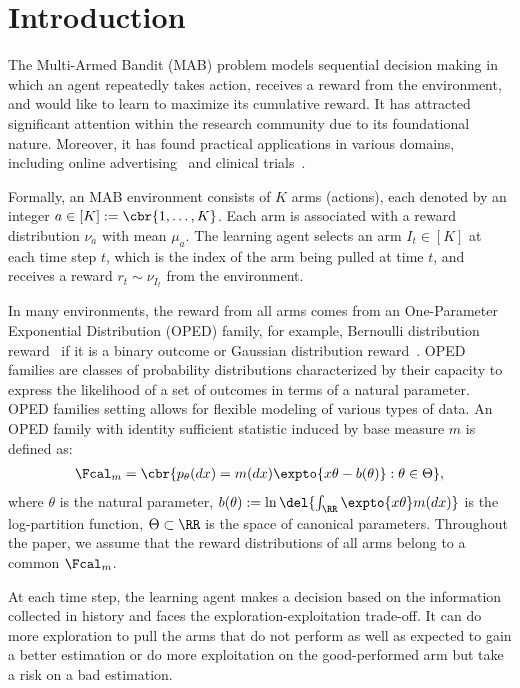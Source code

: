 \section{Introduction}

The Multi-Armed Bandit (MAB) problem models sequential decision making in which an agent repeatedly takes action, receives a reward from the environment, and would like to learn to maximize its cumulative reward.
It has attracted significant attention within the research community due to its foundational nature. Moreover, it has found practical applications in various domains, including online advertising~\citep{geng2021comparison} and clinical trials~\citep{villar2015multi}.

Formally, an MAB environment consists of $K$ arms (actions), each denoted by an integer $a \in [K]:= \cbr{1, \dots, K}$. 
Each arm is associated with a reward distribution $\nu_a$ with mean $\mu_a$. The learning agent selects an arm $I_t \in [K]$ at each time step $t$, which is the index of the arm being pulled at time $t$, and receives a reward $r_t \sim \nu_{I_t}$ from the environment.

In many environments, the reward from all arms comes from an One-Parameter Exponential Distribution (OPED) family, for example, Bernoulli distribution reward~\citep{bouneffouf2017bandit,shen2015portfolio} if it is a binary outcome or Gaussian distribution reward~\citep{jin2021mots}. OPED families are classes of probability distributions characterized by their capacity to express the likelihood of a set of outcomes in terms of a natural parameter. OPED families setting allows for flexible modeling of various types of data.
An OPED family with identity sufficient statistic induced by base measure $m$ is defined as:
\begin{align} \label{eqn:oped}
    \Fcal_m = \cbr{ p_\theta(dx) = m( dx ) \expto{ x \theta - b(\theta) }: \theta \in \Theta  },
\end{align}
where $\theta$ is the natural parameter, $b(\theta) := \ln\del{\int_\RR \expto{ x \theta } m(dx)}$ is the log-partition function, $\Theta \subset \RR$ is the space of canonical parameters. Throughout the paper, we assume that the reward distributions of all arms belong to a common $\Fcal_m$.

At each time step, the learning agent makes a decision based on the information collected in history and faces the exploration-exploitation trade-off.
It can do more exploration to pull the arms that do not perform as well as expected to gain a better estimation or do more exploitation on the good-performed arm but take a risk on a bad estimation.

